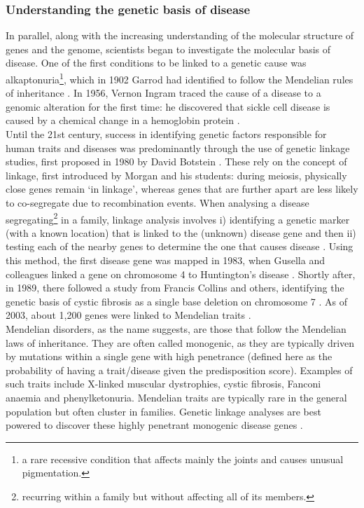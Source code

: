 \subsubsection{Understanding the genetic basis of disease}
\label{sec:disease_genetic}

In parallel, along with the increasing understanding of the molecular structure of genes and the genome, scientists began to investigate the molecular basis of disease.
One of the first conditions to be linked to a genetic cause was alkaptonuria\footnote{a rare recessive condition that affects mainly the joints and causes unusual pigmentation.}, which in 1902 Garrod had identified  to follow the Mendelian rules of inheritance \cite{garrod1902incidence}.
In 1956, Vernon Ingram traced the cause of a disease to a genomic alteration for the first time: he discovered that sickle cell disease is caused by a chemical change in a hemoglobin protein \cite{ingram1963hemoglobins}. \\

Until the 21st century, success in identifying genetic factors responsible for human traits and diseases was predominantly through the use of genetic linkage studies, first proposed in 1980 by David Botstein \cite{botstein1980construction}.
These rely on the concept of linkage, first introduced by Morgan and his students: during meiosis, physically close genes remain `in linkage', whereas genes that are further apart are less likely to co-segregate due to recombination events.
When analysing a disease segregating\footnote{recurring within a family but without affecting all of its members.} in a family, linkage analysis involves i) identifying a genetic marker (with a known location) that is linked to the (unknown) disease gene and then ii) testing each of the nearby genes to determine the one that causes disease \cite{teare2005genetic}. 
Using this method, the first disease gene was mapped in 1983, when Gusella and colleagues linked a gene on chromosome 4 to Huntington's disease \cite{gusella1983polymorphic}.
Shortly after, in 1989, there followed a study from Francis Collins and others, identifying the genetic basis of cystic fibrosis as a single base deletion on chromosome 7 \cite{riordan1989identification}.
As of 2003, about 1,200 genes were linked to Mendelian traits \cite{botstein2003discovering}.\\

Mendelian disorders, as the name suggests, are those that follow the Mendelian laws of inheritance.
They are often called monogenic, as they are typically driven by mutations within a single gene with high penetrance (defined here as the probability of having a trait/disease given the predisposition score). 
Examples of such traits include X-linked muscular dystrophies, cystic fibrosis, Fanconi anaemia and phenylketonuria. 
Mendelian traits are typically rare in the general population but often cluster in families.
Genetic linkage analyses are best powered to discover these highly penetrant monogenic disease genes \cite{cardon2001association}.\\

